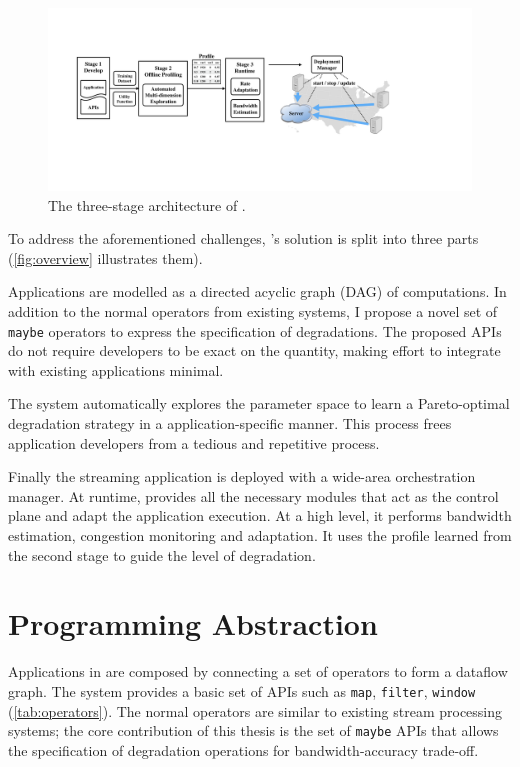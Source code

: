 \begin{figure}
  \centering
  \includegraphics[width=\linewidth]{figures/arch.pdf}
  \caption{The three-stage architecture of \sysname{}.}
  \label{fig:overview}
\end{figure}

To address the aforementioned challenges, \sysname{}'s solution is split into
three parts (\autoref{fig:overview} illustrates them).

 Applications are
modelled as a directed acyclic graph (DAG) of computations. In addition to the
normal operators from existing systems, I propose a novel set of \texttt{maybe}
operators to express the specification of degradations. The proposed APIs do not
require developers to be exact on the quantity, making effort to integrate with
existing applications minimal.

 The
system automatically explores the parameter space to learn a Pareto-optimal
degradation strategy in a application-specific manner. This process frees
application developers from a tedious and repetitive process.

 Finally the streaming
application is deployed with a wide-area orchestration manager. At runtime,
\sysname{} provides all the necessary modules that act as the control plane and
adapt the application execution. At a high level, it performs bandwidth
estimation, congestion monitoring and adaptation. It uses the profile learned
from the second stage to guide the level of degradation.

\section{Programming Abstraction}
\label{sec:prog-abs}

Applications in \sysname{} are composed by connecting a set of operators to form
a dataflow graph. The system provides a basic set of APIs such as \texttt{map},
\texttt{filter}, \texttt{window} (\autoref{tab:operators}). The normal operators
are similar to existing stream processing systems; the core contribution of this
thesis is the set of \texttt{maybe} APIs that allows the specification of
degradation operations for bandwidth-accuracy trade-off.

